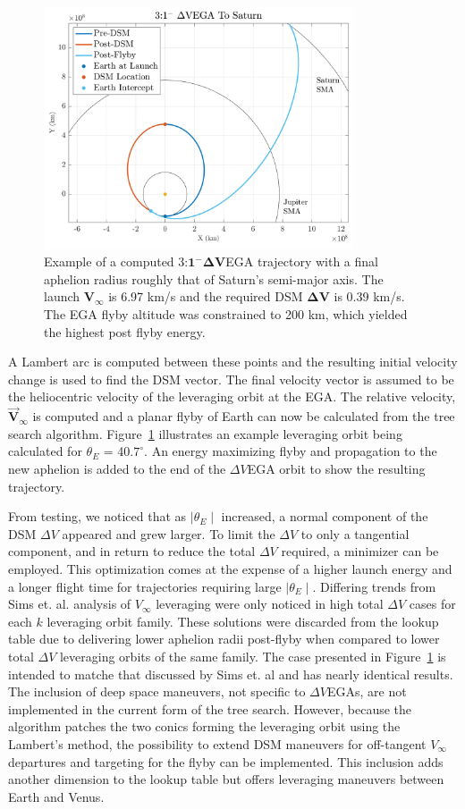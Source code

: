 \documentclass[letterpaper, preprint, paper,11pt]{AAS}	%
\begin{document}
\begin{figure}[htb]
	\centering\includegraphics[width=3.6in]{./fig/dsmmatlab}
    \caption{Example of a computed 3:$\boldsymbol{1^- \Delta V}$EGA trajectory with a final aphelion radius roughly that of Saturn's semi-major axis. The launch $\boldsymbol{V_\infty}$ is 6.97 km/s and the required DSM $\boldsymbol{\Delta V}$ is 0.39 km/s. The EGA flyby altitude was constrained to 200 km, which yielded the highest post flyby energy.}
	\label{fig:dsmmatlab}
\end{figure}

A Lambert arc is computed between these points and the resulting initial velocity change is used to find the DSM vector. The final velocity vector is assumed to be the heliocentric velocity of the leveraging orbit at the EGA. The relative velocity, $\vec{\textbf{V}}_{\infty}$ is computed and a planar flyby of Earth can now be calculated from the tree search algorithm. Figure~\ref{fig:dsmmatlab} illustrates an example leveraging orbit being calculated for $\theta_{E}$ = 40.$7^{\circ}$. An energy maximizing flyby and propagation to the new aphelion is added to the end of the $\Delta V$EGA orbit to show the resulting trajectory.

From testing, we noticed that as $\mid\theta_E\mid$ increased, a normal component of the DSM $\Delta V$ appeared and grew larger. To limit the $\Delta V$ to only a tangential component, and in return to reduce the total $\Delta V$ required, a minimizer can be employed. This optimization comes at the expense of a higher launch energy and a longer flight time for trajectories requiring large $\mid\theta_E\mid$. Differing trends from Sims et. al. analysis of $V_\infty$ leveraging\cite{sims1994} were only noticed in high total $\Delta V$ cases for each $k$ leveraging orbit family. These solutions were discarded from the lookup table due to delivering lower aphelion radii post-flyby when compared to lower total $\Delta V$ leveraging orbits of the same family. The case presented in Figure~\ref{fig:dsmmatlab} is intended to matche that discussed by Sims et. al\cite{Sims1997} and has nearly identical results. The inclusion of deep space maneuvers, not specific to $\Delta V$EGAs, are not implemented in the current form of the tree search. However, because the algorithm patches the two conics forming the leveraging orbit using the Lambert's method, the possibility to extend DSM maneuvers for off-tangent $V_\infty$ departures and targeting for the flyby can be implemented. This inclusion adds another dimension to the lookup table but offers leveraging maneuvers between Earth and Venus.
\end{document}
